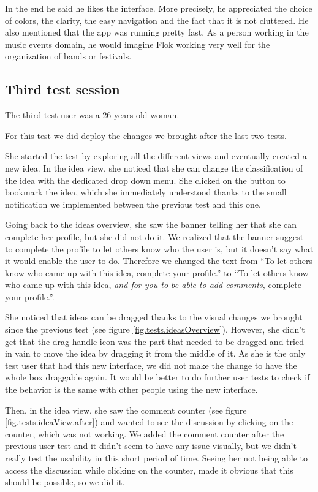 \documentclass[a4paper,12pt, oneside]{article}
\begin{document}
In the end he said he likes the interface.
More precisely, he appreciated the choice of colors, the clarity, the easy navigation and the fact that it is not cluttered.
He also mentioned that the app was running pretty fast.
As a person working in the music events domain, he would imagine Flok working very well for the organization of bands or festivals.

\subsection{Third test session}
The third test user was a 26 years old woman.

For this test we did deploy the changes we brought after the last two tests.

She started the test by exploring all the different views and eventually created a new idea.
In the idea view, she noticed that she can change the classification of the idea with the dedicated drop down menu.
She clicked on the button to bookmark the idea, which she immediately understood thanks to the small notification we implemented between the previous test and this one.

Going back to the ideas overview, she saw the banner telling her that she can complete her profile, but she did not do it.
We realized that the banner suggest to complete the profile to let others know who the user is, but it doesn't say what it would enable the user to do.
Therefore we changed the text from “To let others know who came up with this idea, complete your profile.” to “To let others know who came up with this idea, \emph{and for you to be able to add comments,} complete your profile.”.

She noticed that ideas can be dragged thanks to the visual changes we brought since the previous test (see figure \ref{fig.tests.ideasOverview}).
However, she didn't get that the drag handle icon was the part that needed to be dragged and tried in vain to move the idea by dragging it from the middle of it.
As she is the only test user that had this new interface, we did not make the change to have the whole box draggable again.
It would be better to do further user tests to check if the behavior is the same with other people using the new interface.

Then, in the idea view, she saw the comment counter (see figure \ref{fig.tests.ideaView.after}) and wanted to see the discussion by clicking on the counter, which was not working.
We added the comment counter after the previous user test and it didn't seem to have any issue visually, but we didn't really test the usability in this short period of time.
Seeing her not being able to access the discussion while clicking on the counter, made it obvious that this should be possible, so we did it.
\end{document}
